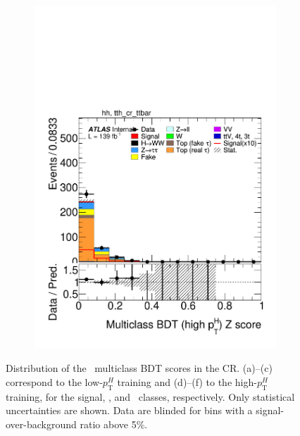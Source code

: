 \begin{figure}[h]
\begin{subfigure}[b]{0.32\textwidth}
    \includegraphics[width=\textwidth]{images/sr_cr_plots/plot_tth_Z_multiclass_gt200_hh_tth_cr_ttbar.pdf}
    \caption{}
  \end{subfigure}

  \caption{Distribution of the \ttH\ multiclass BDT scores in the \ttbar CR.  
  (a)–(c) correspond to the low-$p_{\mathrm{T}}^H$ training and (d)–(f) to the high-$p_{\mathrm{T}}^H$ training,  
  for the signal, \ttbar, and \ztautau\ classes, respectively. Only statistical uncertainties are shown.  
  Data are blinded for bins with a signal-over-background ratio above 5\%.}
  \label{fig:bdt_ttbar}
\end{figure}


